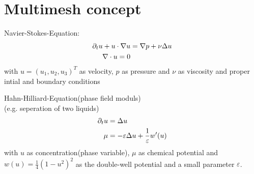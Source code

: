 \section{Multimesh concept}

\begin{example}
	Navier-Stokes-Equation:
	\begin{align*}
		\partial_t u + u \cdot \nabla u &= \nabla p + \nu \Delta u \\
		\nabla \cdot u = 0 
	\end{align*}
	with $u = (u_1,u_2,u_3)^T$ as velocity, $p$ as pressure and $\nu$ as viscosity and proper intial and boundary conditions
\end{example}

\begin{example}
	Hahn-Hilliard-Equation(phase field moduls)\\
	(e.g. seperation of two liquids)
	\begin{align*}
	\partial_t u &= \Delta u \\
	\mu &= -\varepsilon \Delta u + \frac{1}{\varepsilon}w'(u) 
	\end{align*}
	with $u$ as concentration(phase variable), $\mu$ as chemical potential and $w(u) = \frac{1}{4} (1-u^2)^2$ as the double-well potential and a small parameter $\varepsilon$.
	
\end{example}
